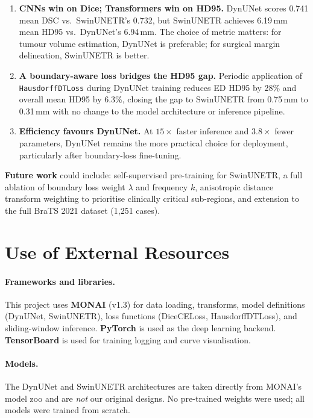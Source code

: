 \documentclass[12pt, letterpaper]{article}
\begin{document}
\begin{enumerate}[leftmargin=*, label=(\arabic*)]
    \item \textbf{CNNs win on Dice; Transformers win on HD95.}
          DynUNet scores 0.741 mean DSC vs.\ SwinUNETR's 0.732, but SwinUNETR
          achieves 6.19\,mm mean HD95 vs.\ DynUNet's 6.94\,mm.
          The choice of metric matters: for tumour volume estimation, DynUNet is
          preferable; for surgical margin delineation, SwinUNETR is better.

    \item \textbf{A boundary-aware loss bridges the HD95 gap.}
          Periodic application of \texttt{HausdorffDTLoss} during DynUNet training
          reduces ED HD95 by 28\% and overall mean HD95 by 6.3\%,
          closing the gap to SwinUNETR from 0.75\,mm to 0.31\,mm with no change
          to the model architecture or inference pipeline.

    \item \textbf{Efficiency favours DynUNet.}
          At $15\times$ faster inference and $3.8\times$ fewer parameters,
          DynUNet remains the more practical choice for deployment,
          particularly after boundary-loss fine-tuning.
\end{enumerate}

\textbf{Future work} could include: self-supervised pre-training for SwinUNETR,
a full ablation of boundary loss weight $\lambda$ and frequency $k$,
anisotropic distance transform weighting to prioritise clinically critical
sub-regions, and extension to the full BraTS 2021 dataset (1{,}251 cases).

\section{Use of External Resources}

\paragraph{Frameworks and libraries.}
This project uses \textbf{MONAI} \cite{monai2020} (v1.3) for data loading,
transforms, model definitions (DynUNet, SwinUNETR), loss functions
(DiceCELoss, HausdorffDTLoss), and sliding-window inference.
\textbf{PyTorch} \cite{paszke2019} is used as the deep learning backend.
\textbf{TensorBoard} is used for training logging and curve visualisation.

\paragraph{Models.}
The DynUNet and SwinUNETR architectures are taken directly from MONAI's model
zoo and are \emph{not} our original designs.
No pre-trained weights were used; all models were trained from scratch.
\end{document}
